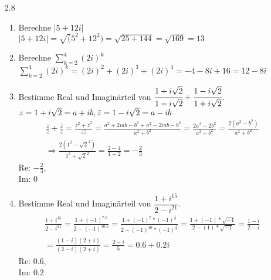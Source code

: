\documentclass[12pt,letterpaper]{article}
\begin{document}
\begin{enumerate}
\begin{enumerate}
\end{enumerate}
\item [2.8]
\begin{enumerate}
\item Berechne $|5+12i|$\\
$|5+12i| = \sqrt(5^2+12^2) = \sqrt{25+144} = \sqrt{169} = 13$
\item Berechne $\sum\limits_{k=2}^{4}(2i)^k$\\
$\sum\limits_{k=2}^{4}(2i)^k = (2i)^2+(2i)^3+(2i)^4 = -4-8i+16 = 12-8i$
\item Bestimme Real und Imaginärteil von $\cfrac{1+i\sqrt{2}}{1-i\sqrt{2}}+\cfrac{1-i\sqrt{2}}{1+i\sqrt{2}}$.\\
$z = 1+i\sqrt{2} = a+ib,\\
\bar{z} = 1-i\sqrt{2} = a-ib$
\begin{align*}
\frac{z}{\bar{z}}+\frac{\bar{z}}{z} = \frac{z^2+\bar{z}^2}{z\bar{z}} = \frac{a^2+2iab-b^2+a^2-2iab-b^2}{a^2+b^2} = \frac{2a^2-2b^2}{a^2+b^2} = \frac{2(a^2-b^2)}{a^2+b^2}\\
\Rightarrow\frac{2(1^2-\sqrt{2}^2)}{1^2+\sqrt{2}^2}=\frac{2-4}{1+2} = -\frac{2}{3}
\end{align*}
Re: $-\frac{2}{3}$,\\
Im: $0$
\item Bestimme Real und Imaginärteil von $\dfrac{1+i^{15}}{2-i^{21}}$.
\begin{align*}
\frac{1+i^{15}}{2-i^{21}} = \frac{1+(-1)^{7.5}}{2-(-1)^{10.5}} = \frac{1+(-1)^7*(-1)^{\frac{1}{2}}}{2-(-1)^{10}*(-1)^{\frac{1}{2}}} = \frac{1+(-1)*\sqrt{-1}}{2-(1)*\sqrt{-1}} = \frac{1-i}{2-i}\\
=\frac{(1-i)(2+i)}{(2-i)(2+i)} = \frac{2-i}{5} = 0.6+0.2i
\end{align*}
Re: $0.6$,\\
Im: $0.2$
\end{enumerate}
\end{enumerate}
\end{document}
